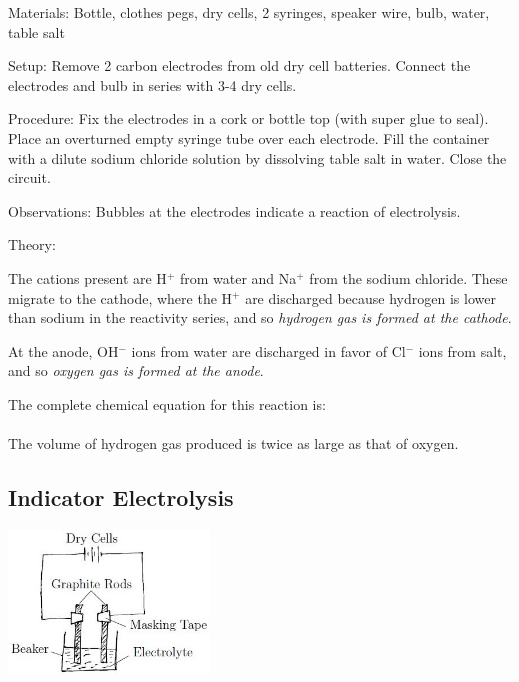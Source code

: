 \begin{multicols}{2}
\begin{description*}
\item[Materials:]{Bottle, clothes pegs, dry cells, 2 syringes, speaker wire, bulb, water, table salt}
\item[Setup:]{Remove 2 carbon electrodes from old dry cell batteries. Connect the electrodes and bulb in series with 3-4 dry cells.}
\item[Procedure:]{Fix the electrodes in a cork or bottle top (with super glue to seal). Place an overturned empty syringe tube over each electrode. Fill the container with a dilute sodium chloride solution by dissolving table salt in water. Close the circuit.}
\item[Observations:]{Bubbles at the electrodes indicate a reaction of electrolysis.}
\item[Theory:]{The cations present are H$^+$ from water and Na$^+$ from the sodium chloride. These migrate to the cathode, where the H$^+$ are discharged because hydrogen is lower than sodium in the reactivity series, and so \emph{hydrogen gas is formed at the cathode}. 

At the anode, OH$^-$ ions from water are discharged in favor of Cl$^-$ ions from salt, and so \emph{oxygen gas is formed at the anode}.

The complete chemical equation for this reaction is:\\

\\

The volume of hydrogen gas produced is twice as large as that of oxygen.}
\end{description*}

\vfill
\columnbreak

\subsection{Indicator Electrolysis} 

\begin{center}
\includegraphics[width=0.4\textwidth]{./img/electrolysis.jpg}
\end{center}


\end{multicols}
